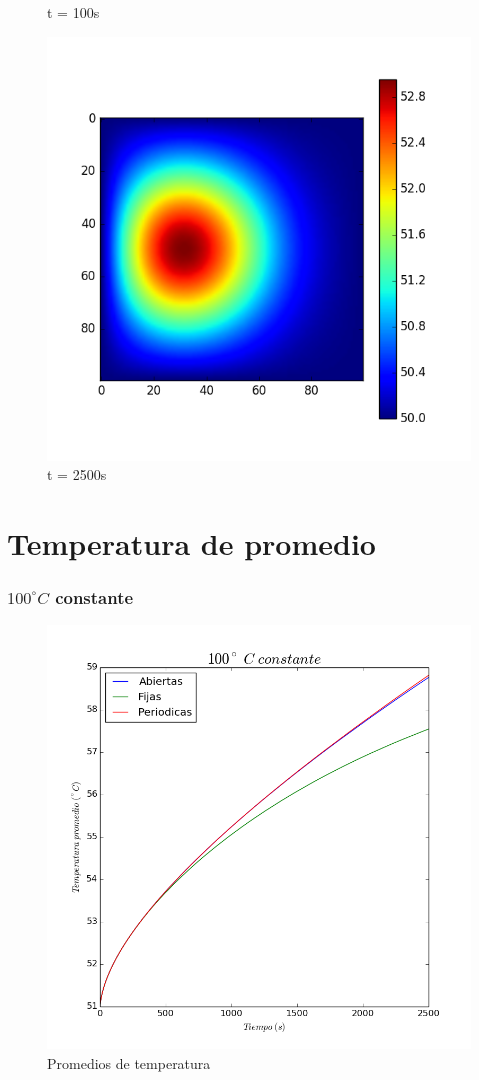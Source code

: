 \documentclass{article}
\begin{document}
\begin{figure}[H]
  \caption{t = 100s}\label{fig:awesome_image2}
\endminipage\hfill
{}%
  \includegraphics[width=\linewidth]{fijasNOCte2500.png}
  \caption{t = 2500s}\label{fig:awesome_image3}
\endminipage
\end{figure}


\section{Temperatura de promedio}
\subsubsection{$100^\circ C$ constante}

\begin{figure}[H]
\includegraphics[width=\linewidth]{promCaso1.png}
\caption{Promedios de temperatura}
\end{figure}
\end{document}
